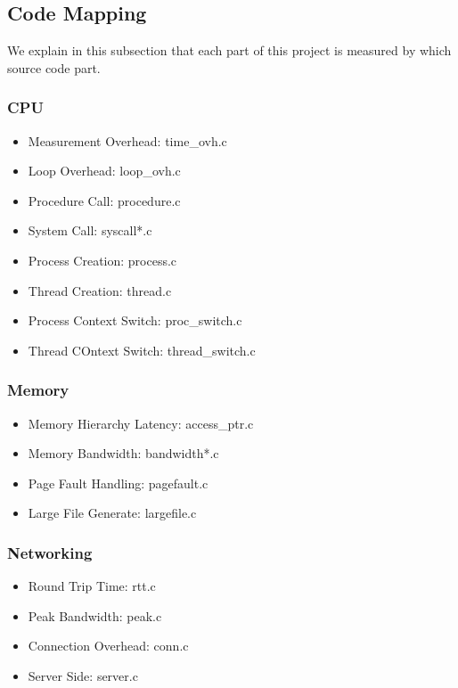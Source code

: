 \subsection{Code Mapping}

We explain in this subsection that each part of this project is measured by which source code part.

\subsubsection{CPU}
\begin{itemize}
    \item Measurement Overhead: time\_ovh.c
    \item Loop Overhead: loop\_ovh.c
    \item Procedure Call: procedure.c
    \item System Call: syscall*.c
    \item Process Creation: process.c
    \item Thread Creation: thread.c
    \item Process Context Switch: proc\_switch.c
    \item Thread COntext Switch: thread\_switch.c
\end{itemize}

\subsubsection{Memory}
\begin{itemize}
    \item Memory Hierarchy Latency: access\_ptr.c
    \item Memory Bandwidth: bandwidth*.c
    \item Page Fault Handling: pagefault.c
    \item Large File Generate: largefile.c
\end{itemize}

\subsubsection{Networking}
\begin{itemize}
    \item Round Trip Time: rtt.c
    \item Peak Bandwidth: peak.c
    \item Connection Overhead: conn.c
    \item Server Side: server.c
\end{itemize}

